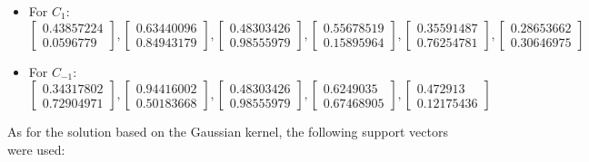 \documentclass[letterpaper,headings=standardclasses]{scrartcl}
\begin{document}
\begin{itemize}
    \item For $C_1$:
    $$ \left[ \begin{matrix} 0.43857224 \\ 0.0596779 \end{matrix} \right], \left[ \begin{matrix} 0.63440096 \\ 0.84943179 \end{matrix} \right],     \left[ \begin{matrix} 0.48303426 \\ 0.98555979 \end{matrix} \right],     \left[ \begin{matrix} 0.55678519 \\ 0.15895964 \end{matrix} \right],     \left[ \begin{matrix} 0.35591487 \\ 0.76254781 \end{matrix} \right],     \left[ \begin{matrix} 0.28653662 \\ 0.30646975 \end{matrix} \right] $$

    \item For $C_{-1}$:
    $$ \left[ \begin{matrix} 0.34317802 \\ 0.72904971 \end{matrix} \right], \left[ \begin{matrix} 0.94416002 \\ 0.50183668 \end{matrix} \right], \left[ \begin{matrix} 0.48303426 \\ 0.98555979 \end{matrix} \right], \left[ \begin{matrix} 0.6249035 \\ 0.67468905 \end{matrix} \right], \left[ \begin{matrix} 0.472913 \\ 0.12175436 \end{matrix} \right] $$
\end{itemize}

As for the solution based on the Gaussian kernel, the following support vectors were used:
\end{document}
